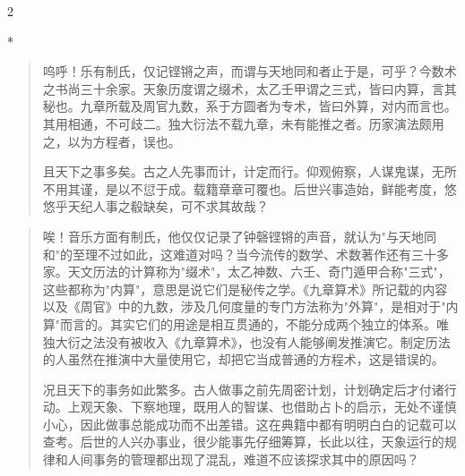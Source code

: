 \documentclass[11pt,a4paper]{article}
\newenvironment{preface}{%
  \begin{quote}\color{prefacecolor}%
}{\end{quote}}
\begin{document}
\begin{paracol}{2}

\switchcolumn[0]*\begin{preface}
呜呼！乐有制氏，仅记铿锵之声，而谓与天地同和者止于是，可乎？今数术之书尚三十余家。天象历度谓之缀术，太乙壬甲谓之三式，皆曰内算，言其秘也。九章所载及周官九数，系于方圆者为专术，皆曰外算，对内而言也。其用相通，不可歧二。独大衍法不载九章，未有能推之者。历家演法颇用之，以为方程者，误也。

且天下之事多矣。古之人先事而计，计定而行。仰观俯察，人谋鬼谋，无所不用其谨，是以不愆于成。载籍章章可覆也。后世兴事造始，鲜能考度，悠悠乎天纪人事之殽缺矣，可不求其故哉？
\end{preface}

\switchcolumn\begin{quote}\small\color{prefacecolor}
唉！音乐方面有制氏，他仅仅记录了钟磬铿锵的声音，就认为"与天地同和"的至理不过如此，这难道对吗？当今流传的数学、术数著作还有三十多家。天文历法的计算称为"缀术"，太乙神数、六壬、奇门遁甲合称"三式"，这些都称为"内算"，意思是说它们是秘传之学。《九章算术》所记载的内容以及《周官》中的九数，涉及几何度量的专门方法称为"外算"，是相对于"内算"而言的。其实它们的用途是相互贯通的，不能分成两个独立的体系。唯独大衍之法没有被收入《九章算术》，也没有人能够阐发推演它。制定历法的人虽然在推演中大量使用它，却把它当成普通的方程术，这是错误的。

况且天下的事务如此繁多。古人做事之前先周密计划，计划确定后才付诸行动。上观天象、下察地理，既用人的智谋、也借助占卜的启示，无处不谨慎小心，因此做事总能成功而不出差错。这在典籍中都有明明白白的记载可以查考。后世的人兴办事业，很少能事先仔细筹算，长此以往，天象运行的规律和人间事务的管理都出现了混乱，难道不应该探求其中的原因吗？
\end{quote}

\end{paracol}
\end{document}
